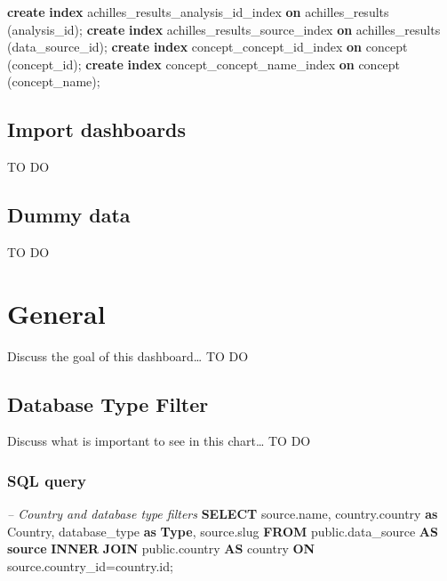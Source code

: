 \documentclass[]{book}
\newenvironment{Shaded}{\begin{snugshade}}{\end{snugshade}}
\newcommand{\KeywordTok}[1]{\textcolor[rgb]{0.13,0.29,0.53}{\textbf{#1}}}
\newcommand{\CommentTok}[1]{\textcolor[rgb]{0.56,0.35,0.01}{\textit{#1}}}
\newcommand{\NormalTok}[1]{#1}
\begin{document}
\begin{enumerate}
\begin{Shaded}
\begin{Highlighting}[]
\KeywordTok{create} \KeywordTok{index}\NormalTok{ achilles_results_analysis_id_index }\KeywordTok{on} 
\NormalTok{    achilles_results (analysis_id);}
\KeywordTok{create} \KeywordTok{index}\NormalTok{ achilles_results_source_index }\KeywordTok{on}\NormalTok{ achilles_results }
\NormalTok{    (data_source_id);}
\KeywordTok{create} \KeywordTok{index}\NormalTok{ concept_concept_id_index }\KeywordTok{on}\NormalTok{ concept (concept_id);}
\KeywordTok{create} \KeywordTok{index}\NormalTok{ concept_concept_name_index }\KeywordTok{on}\NormalTok{ concept }
\NormalTok{    (concept_name);}
\end{Highlighting}
\end{Shaded}
\end{enumerate}

\section{Import dashboards}\label{import-dashboards}

TO DO

\section{Dummy data}\label{dummy-data}

TO DO

\chapter{General}\label{general}

Discuss the goal of this dashboard\ldots{} TO DO

\section{Database Type Filter}\label{database-type-filter}

Discuss what is important to see in this chart\ldots{} TO DO

\subsection{SQL query}\label{sql-query}

\begin{Shaded}
\begin{Highlighting}[]
\CommentTok{--  Country and database type filters}
\KeywordTok{SELECT}\NormalTok{ source.name, }
\NormalTok{       country.country }\KeywordTok{as}\NormalTok{ Country, }
\NormalTok{       database_type }\KeywordTok{as} \KeywordTok{Type}\NormalTok{,}
\NormalTok{       source.slug}
\KeywordTok{FROM}\NormalTok{ public.data_source }\KeywordTok{AS} \KeywordTok{source} \KeywordTok{INNER} \KeywordTok{JOIN}\NormalTok{ public.country }
  \KeywordTok{AS}\NormalTok{ country }\KeywordTok{ON}\NormalTok{ source.country_id=country.id;}
\end{Highlighting}
\end{Shaded}
\end{document}
